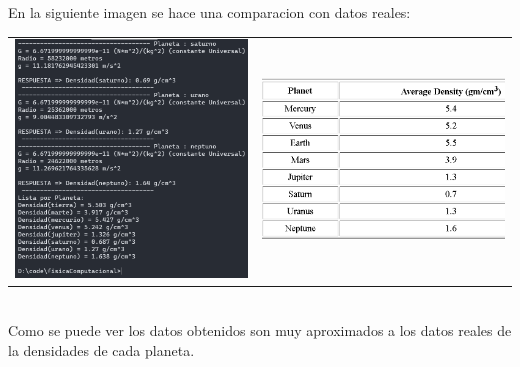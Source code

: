 \documentclass[a4paper,12pt]{article}
\begin{document}
    En la siguiente imagen se hace una comparacion con datos reales:
    \begin{table}[hbp]
        \centering
        \begin{tabular}{cc}
            \begin{minipage}{.3\textwidth}
                \includegraphics[width=\linewidth]{e2_2}
            \end{minipage}&
            \begin{minipage}{.3\textwidth}
                \includegraphics[width=\linewidth]{e2real}
            \end{minipage}        
        \end{tabular}
    \end{table}
    \\
    Como se puede ver los datos obtenidos son muy aproximados a los datos reales de la densidades de cada planeta.
\end{document}
